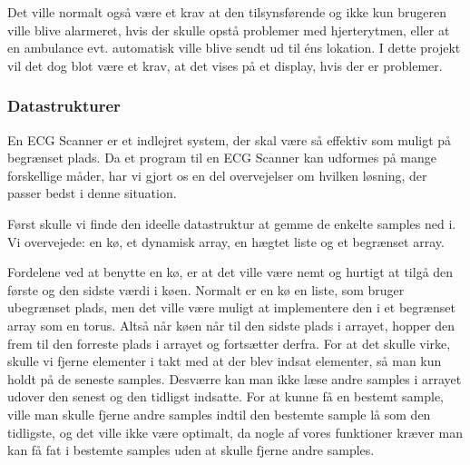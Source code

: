 \documentclass{article}
\begin{document}
Det ville normalt også være et krav at den tilsynsførende og ikke kun brugeren ville blive alarmeret, hvis der skulle opstå problemer med hjerterytmen, eller at en ambulance evt. automatisk ville blive sendt ud til éns lokation. I dette projekt vil det dog blot være et krav, at det vises på et display, hvis der er problemer.

\subsubsection{Datastrukturer}
En ECG Scanner er et indlejret system, der skal være så effektiv som muligt på begrænset plads. Da et program til en ECG Scanner kan udformes på mange forskellige måder, har vi gjort os en del overvejelser om hvilken løsning, der passer bedst i denne situation.

Først skulle vi finde den ideelle datastruktur at gemme de enkelte samples ned i. Vi overvejede: en kø, et dynamisk array, en hægtet liste og et begrænset array.

Fordelene ved at benytte en kø, er at det ville være nemt og hurtigt at tilgå den første og den sidste værdi i køen. Normalt er en kø en liste, som bruger ubegrænset plads, men det ville være muligt at implementere den i et begrænset array som en torus. Altså når køen når til den sidste plads i arrayet, hopper den frem til den forreste plads i arrayet og fortsætter derfra. For at det skulle virke, skulle vi fjerne elementer i takt med at der blev indsat elementer, så man kun holdt på de seneste samples. Desværre kan man ikke læse andre samples i arrayet udover den senest og den tidligst indsatte. For at kunne få en bestemt sample, ville man skulle fjerne andre samples indtil den bestemte sample lå som den tidligste, og det ville ikke være optimalt, da nogle af vores funktioner kræver man kan få fat i bestemte samples uden at skulle fjerne andre samples.
\end{document}
